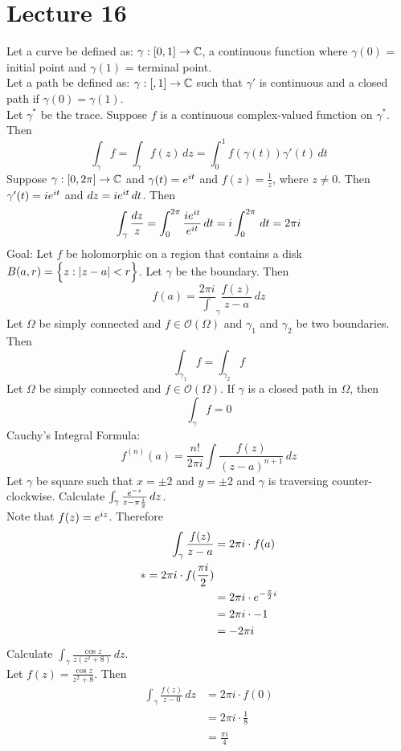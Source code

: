 \documentclass[12pt]{article}
\begin{document}
\section{Lecture 16} 
Let a curve be defined as: $\gamma: [0,1] \to \mathbb{C}$, a continuous function where $\gamma(0)$ = initial point and $\gamma(1)$ = terminal point. \\
Let a path be defined as: $\gamma: [,1] \to \mathbb{C}$ such that $\gamma'$ is continuous and a closed path if $\gamma(0) = \gamma(1)$.\\
Let $\gamma^*$ be the trace. Suppose $f$ is a continuous complex-valued function on $\gamma^*$. Then $$ \int_\gamma f = \int_\gamma f(z) \, dz = \int_0^1 f(\gamma(t))\gamma'(t)\, dt $$ 
Suppose $\gamma: [0,2\pi] \to \mathbb{C}$ and $\gamma(t) = e^{it}$ and $f(z) = \frac{1}{z}$, where $z \neq 0$. Then $\gamma'(t) = ie^{it}$ and $dz = ie^{it}\, dt$. Then $$\int_\gamma \frac{dz}{z} = \int_0^{2\pi} \frac{ie^{it}}{e^{it}} \, dt = i\int_0^{2\pi} \, dt = 2\pi i $$ 
Goal: Let $f$ be holomorphic on a region that contains a disk $B(a,r) = \Big\{ z: \abs{z-a} < r \Big\}$. Let $\gamma$ be the boundary. Then $$f(a) = \frac{2\pi i} \int_\gamma \frac{f(z)}{z-a} \, dz $$ 
Let $\Omega$ be simply connected and $f \in \mathcal{O}(\Omega)$ and $\gamma_1$ and $\gamma_2$ be two boundaries. Then $$\int_{\gamma_1} f = \int_{\gamma_2} f $$ 
Let $\Omega$ be simply connected and $f \in \mathcal{O}(\Omega)$. If $\gamma$ is a closed path in $\Omega$, then $$ \int_\gamma f = 0$$ 
Cauchy's Integral Formula: $$ f^{(n)}(a) = \frac{n!}{2\pi i} \int \frac{f(z)}{(z-a)^{n+1}} \, dz $$ 
Let $\gamma$ be square such that $x = \pm 2$ and $y = \pm 2$ and $\gamma$ is traversing counter-clockwise. Calculate $\int_\gamma \frac{e^{-z}}{z - \pi\frac{i}{2}} \, dz$. \\
Note that $f(z) = e^{iz}$. Therefore $$ \begin{aligned} \int_\gamma \frac{f(z)}{z-a} &= 2\pi i \cdot f(a) \\ *= 2\pi i \cdot f(\frac{\pi i}{2}) \\ &= 2\pi i \cdot e^{-\frac{\pi}{2}i} \\ &= 2\pi i \cdot -1 \\ &= -2\pi i \end{aligned} $$ 
Calculate $\int_\gamma \frac{\cos z}{z(z^2 + 8)} \, dz $. \\
Let $f(z) = \frac{\cos z}{z^2 + 8}$. Then $$ \begin{aligned} \int_\gamma \frac{f(z)}{z-0} \, dz &= 2\pi i \cdot f(0) \\ &= 2\pi i \cdot \frac{1}{8} \\ &= \frac{\pi i}{4} \end{aligned} $$ 
\end{document}
